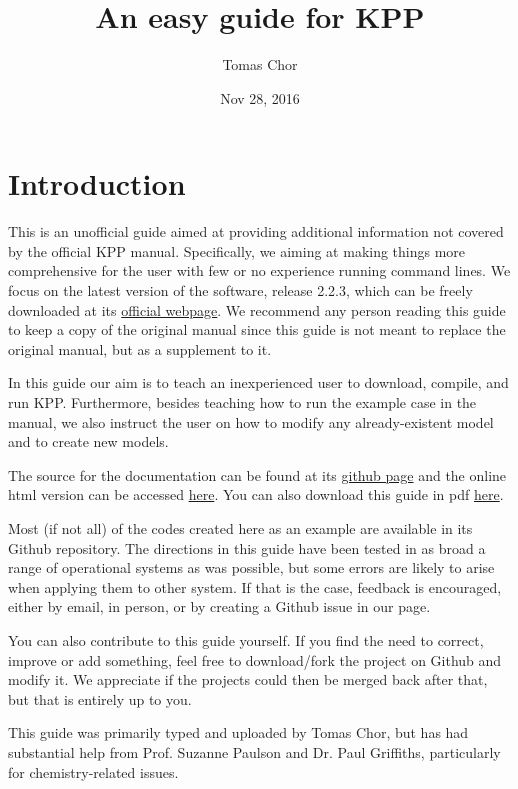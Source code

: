 \documentclass[letterpaper,10pt,openany,oneside]{sphinxmanual}
\title{An easy guide for KPP}
\date{Nov 28, 2016}
\author{Tomas Chor}
\begin{document}
\maketitle
\tableofcontents
{}\label{index::doc}



\chapter{Introduction}
\label{README:introduction}\label{README:easy-guide-to-compiling-and-running-kpp}\label{README::doc}
This is an unofficial guide aimed at providing additional information not
covered by the official KPP manual. Specifically, we aiming at making things
more comprehensive for the user with few or no experience running command
lines. We focus on the latest version of the software, release 2.2.3, which can
be freely downloaded at its \href{http://people.cs.vt.edu/~asandu/Software/Kpp/}{official webpage}. We recommend any person
reading this guide to keep a copy of the original manual since this guide is
not meant to replace the original manual, but as a supplement to it.

In this guide our aim is to teach an inexperienced user to download, compile,
and run KPP. Furthermore, besides teaching how to run the example case in the
manual, we also instruct the user on how to modify any already-existent model
and to create new models.

The source for the documentation can be found at its \href{https://github.com/tomchor/ezkpp}{github page} and the online html version can be
accessed \href{https://tomchor.github.io/ezkpp/}{here}. You can also download this
guide in pdf \href{https://github.com/tomchor/ezkpp/raw/gh-pages/ezkpp.pdf}{here}.

Most (if not all) of the codes created here as an example are available in its
Github repository. The directions in this guide have been tested in as broad a
range of operational systems as was possible, but some errors are likely to
arise when applying them to other system. If that is the case, feedback is
encouraged, either by email, in person, or by creating a Github issue in our
page.

You can also contribute to this guide yourself. If you find the need to
correct, improve or add something, feel free to download/fork the project on
Github and modify it. We appreciate if the projects could then be merged back
after that, but that is entirely up to you.

This guide was primarily typed and uploaded by Tomas Chor, but has had
substantial help from Prof. Suzanne Paulson and Dr. Paul Griffiths,
particularly for chemistry-related issues.
\end{document}
